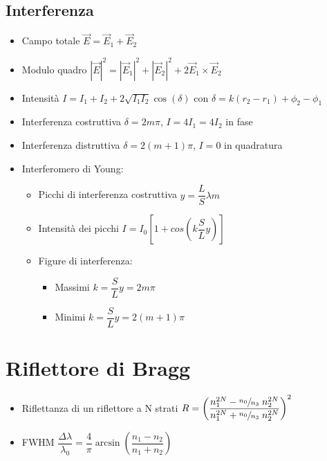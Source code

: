 \documentclass{article}
\begin{document}
\subsection{Interferenza}
\begin{itemize}
  \item Campo totale \( \vec{E} = \vec{E}_1 + \vec{E}_2 \)
  \item Modulo quadro \( \displaystyle |\vec{E}| ^ 2 = |\vec{E}_1| ^ 2 + |\vec{E}_2| ^ 2 + 2 \vec{E}_1 \times \vec{E}_2 \)
  \item Intensità \( \displaystyle  I = I_1 + I_2 + 2 \sqrt{I_1 I_2} \cos(\delta) \) con \( \delta = k(r_2 - r_1) + \phi_2 - \phi_1 \) %
  \item Interferenza costruttiva \( \delta = 2 m \pi \), \(I = 4 I_1 = 4 I_2 \) in fase
  \item Interferenza distruttiva \( \delta = 2 (m + 1) \pi \), \(I = 0 \) in quadratura
  \item Interferomero di Young:
        \begin{itemize}
          \item Picchi di interferenza costruttiva \( y = \dfrac{L}{S} \lambda m \)
          \item Intensità dei picchi \( I = I_0  \left[ 1 + cos\left( k \dfrac{S}{L} y \right) \right] \)
          \item Figure di interferenza:
                \begin{itemize}
                  \item Massimi \( k = \dfrac{S}{L} y = 2m \pi \)
                  \item Minimi \( k = \dfrac{S}{L} y = 2(m+1) \pi \)
                \end{itemize}
        \end{itemize}
\end{itemize}

\newpage

\section{Riflettore di Bragg}
\begin{itemize}
  \item Riflettanza di un riflettore a N strati \( R = \left( \dfrac{n_1 ^ {2N} - \sfrac{n_0}{n_3} \; n_2 ^ {2N}}{n_1 ^ {2N} + \sfrac{n_0}{n_3} \; n_2 ^ {2N}} \right) ^ 2 \)
  \item FWHM \( \dfrac{\Delta \lambda}{\lambda_0} = \dfrac{4}{\pi} \arcsin \left( \dfrac{n_1 - n_2}{n_1 + n_2} \right) \)
\end{itemize}
\end{document}
